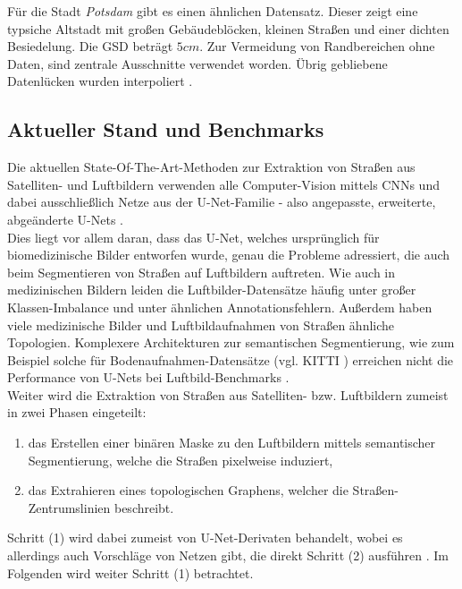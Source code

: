 Für die Stadt \textit{Potsdam} gibt es einen ähnlichen Datensatz. 
Dieser zeigt eine typsiche Altstadt mit großen Gebäudeblöcken, kleinen Straßen und einer dichten Besiedelung.
Die \ac{GSD} beträgt $5cm$.
Zur Vermeidung von Randbereichen ohne Daten, sind zentrale Ausschnitte verwendet worden.
Übrig gebliebene Datenlücken wurden interpoliert \cite{Englich.17.11.2022, Englich.17.11.2022b}.

\subsection{Aktueller Stand und Benchmarks} \label{sec:state-of-the-art-roads} %

Die aktuellen State-Of-The-Art-Methoden zur Extraktion von Straßen aus Satelliten- und Luftbildern verwenden 
alle Computer-Vision mittels \acp{CNN} und dabei ausschließlich Netze aus der U-Net-Familie - also angepasste, 
erweiterte, abgeänderte U-Nets \cites{C.Henry.2021, Constantin.2018, Kamiya.2018, Yerram.2022}. \\
Dies liegt vor allem daran, dass das U-Net, welches ursprünglich für biomedizinische Bilder entworfen wurde, 
genau die Probleme adressiert, die auch beim Segmentieren von Straßen auf Luftbildern auftreten. 
Wie auch in medizinischen Bildern leiden die Luftbilder-Datensätze häufig unter großer Klassen-Imbalance 
und unter ähnlichen Annotationsfehlern. Außerdem haben viele medizinische Bilder und Luftbildaufnahmen von Straßen 
ähnliche Topologien. Komplexere Architekturen zur semantischen Segmentierung, wie zum Beispiel solche 
für Bodenaufnahmen-Datensätze (vgl. KITTI \cite{Geiger.2013}) erreichen nicht die Performance von U-Nets bei 
Luftbild-Benchmarks \cite{C.Henry.2021}. \\
Weiter wird die Extraktion von Straßen aus Satelliten- bzw. Luftbildern zumeist in zwei Phasen eingeteilt: 
\begin{enumerate}
	\item das Erstellen einer binären Maske zu den Luftbildern mittels semantischer Segmentierung, 
	welche die Straßen pixelweise induziert, 
	\item das Extrahieren eines topologischen Graphens, welcher die Straßen-Zentrumslinien beschreibt.   
\end{enumerate}
Schritt (1) wird dabei zumeist von U-Net-Derivaten behandelt, wobei es allerdings auch Vorschläge von Netzen gibt, 
die direkt Schritt (2) ausführen \cite{C.Henry.2021}.
Im Folgenden wird weiter Schritt (1) betrachtet.   

